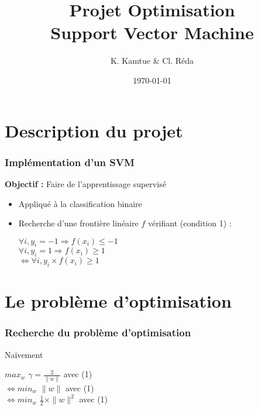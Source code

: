 \documentclass{beamer}
\title{Projet Optimisation\\Support Vector Machine}
\author{K. Kamtue \& Cl. Réda}
\institute{ENS Cachan}
\date{\today}
\begin{document}
\maketitle
\tableofcontents
\setlength{\parindent}{1cm}


\section{Description du projet}

\begin{frame}
\frametitle{Implémentation d'un SVM}

\begin{center}
\textbf{Objectif :} Faire de l'apprentissage supervisé
\end{center}

\begin{itemize}
\item Appliqué à la classification binaire

         \begin{center}
         \end{center}

\item Recherche d'une frontière linéaire $f$ vérifiant (condition 1) :

         \begin{center}
         $\forall i, y_i = -1 \Rightarrow f(x_i) \leq -1$\\
         $\forall i, y_i = 1 \Rightarrow f(x_i) \geq 1$\\
         $\Leftrightarrow \forall i, y_i \times f(x_i) \geq 1$
         \end{center}
\end{itemize}

\end{frame}

\section{Le problème d'optimisation}

\begin{frame}
\frametitle{Recherche du problème d'optimisation}

\begin{block}{Naïvement}

      \begin{center}
        $max_{w}$ $\gamma = \frac{2}{\|w\|}$ avec (1)\\
        $\Leftrightarrow min_{w}$ $\|w\|$ avec (1)\\
        $\Leftrightarrow min_{w}$ $\frac{1}{2} \times \|w\|^2$ avec (1)
      \end{center}

\end{block}

\end{frame}
\end{document}
